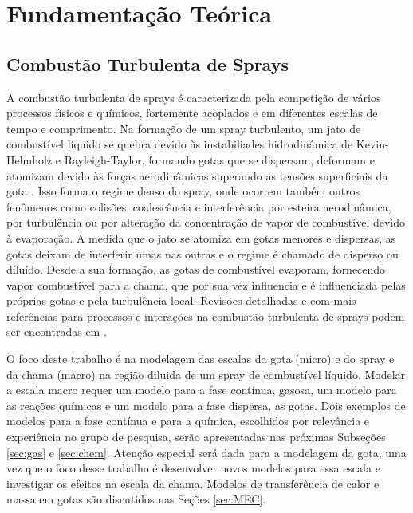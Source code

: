 \section{Fundamentação Teórica}



\subsection{Combustão Turbulenta de Sprays}

A combustão turbulenta de sprays é caracterizada pela competição de vários processos físicos e químicos, fortemente acoplados e em diferentes escalas de tempo e comprimento. 
Na formação de um spray turbulento, um jato de combustível líquido se quebra devido às instabiliades hidrodinâmica de Kevin-Helmholz e Rayleigh-Taylor, formando gotas que se dispersam, deformam e atomizam devido às forças aerodinâmicas superando as tensões superficiais da gota \cite{JennyB2012}.
Isso forma o {regime denso} do spray, onde ocorrem também outros fenômenos como colisões, coalescência e interferência por esteira aerodinâmica, por turbulência ou por alteração da concentração de vapor de combustível devido à evaporação.
A medida que o jato se atomiza em gotas menores e dispersas, as gotas deixam de interferir umas nas outras e o regime é chamado de disperso ou diluído. 
Desde a sua formação, as gotas de combustível evaporam, fornecendo vapor combustível para a chama, que por sua vez influencia e é influenciada pelas próprias gotas e pela turbulência local.
Revisões detalhadas e com mais referências para processos e interações na combustão turbulenta de sprays podem ser encontradas em \cite{JennyB2012, MasriA2016, SanchezA2015, ZhouL2021} .

O foco deste trabalho é na modelagem das escalas da gota (micro) e do spray e da chama (macro) na região diluida de um spray de combustível líquido.
Modelar a escala macro requer um modelo para a fase contínua, gasosa, um modelo para as reações químicas e um modelo para a fase dispersa, as gotas.
Dois exemplos de modelos para a fase contínua e para a química, escolhidos por relevância e experiência no grupo de pesquisa, serão apresentadas nas próximas Subseções \ref{sec:gas} e \ref{sec:chem}.
Atenção especial será dada para a modelagem da gota, uma vez que o foco desse trabalho é desenvolver novos modelos para essa escala e investigar os efeitos na escala da chama.
Modelos de transferência de calor e massa em gotas são discutidos nas Seções \ref{sec:MEC}. 


